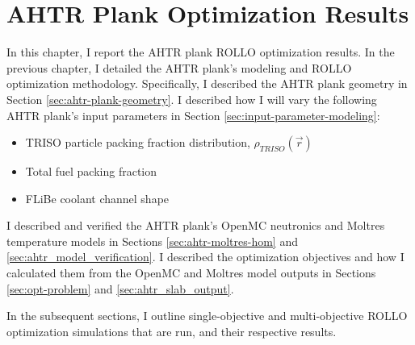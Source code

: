 \chapter{AHTR Plank Optimization Results}
In this chapter, I report the \gls{AHTR} plank \gls{ROLLO} optimization results. 
In the previous chapter, I detailed the \gls{AHTR} plank's modeling and \gls{ROLLO} 
optimization methodology. 
Specifically, I described the \gls{AHTR} plank geometry in Section 
\ref{sec:ahtr-plank-geometry}.
I described how I will vary the following \gls{AHTR} plank's input parameters in Section
\ref{sec:input-parameter-modeling}:  
\begin{itemize}
    \item \gls{TRISO} particle packing fraction distribution, 
    $\rho_{TRISO}(\vec{r})$
    \item Total fuel packing fraction
    \item \gls{FLiBe} coolant channel shape 
\end{itemize} 
I described and verified the \gls{AHTR} plank's OpenMC neutronics and Moltres 
temperature models in Sections \ref{sec:ahtr-moltres-hom} and 
\ref{sec:ahtr_model_verification}. 
I described the optimization objectives and how I calculated them from the OpenMC 
and Moltres model outputs in Sections \ref{sec:opt-problem} and 
\ref{sec:ahtr_slab_output}.

In the subsequent sections, I outline single-objective and multi-objective 
ROLLO optimization simulations that are run, and their respective results. 

